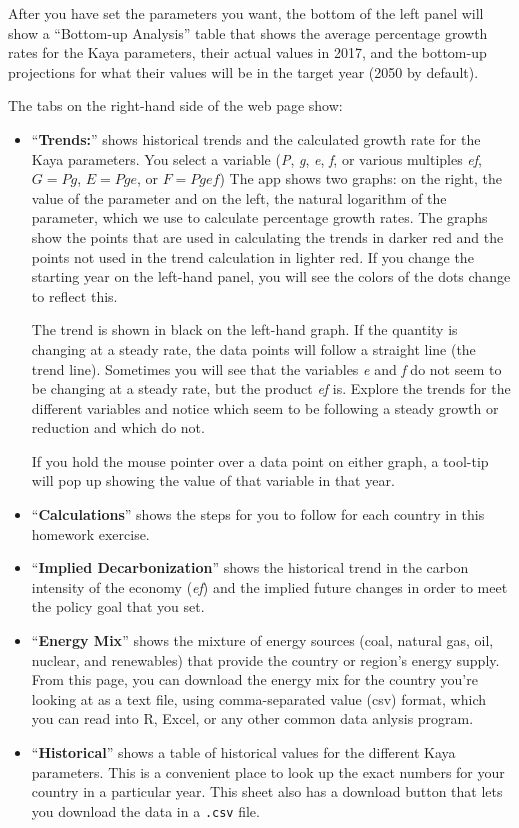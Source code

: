 \documentclass[
]{article}
\begin{document}
After you have set the parameters you want, the bottom of the left panel
will show a ``Bottom-up Analysis'' table that shows the average
percentage growth rates for the Kaya parameters, their actual values in
2017, and the bottom-up projections for what their values will be in the
target year (2050 by default).

The tabs on the right-hand side of the web page show:

\begin{itemize}
\item
  ``\textbf{Trends:}'' shows historical trends and the calculated growth
  rate for the Kaya parameters. You select a variable (\emph{P},
  \emph{g}, \emph{e}, \emph{f}, or various multiples \emph{ef},
  \(G = Pg\), \(E = Pge\), or \(F = Pgef\)) The app shows two graphs: on
  the right, the value of the parameter and on the left, the natural
  logarithm of the parameter, which we use to calculate percentage
  growth rates. The graphs show the points that are used in calculating
  the trends in darker red and the points not used in the trend
  calculation in lighter red. If you change the starting year on the
  left-hand panel, you will see the colors of the dots change to reflect
  this.

  The trend is shown in black on the left-hand graph. If the quantity is
  changing at a steady rate, the data points will follow a straight line
  (the trend line). Sometimes you will see that the variables \emph{e}
  and \emph{f} do not seem to be changing at a steady rate, but the
  product \emph{ef} is. Explore the trends for the different variables
  and notice which seem to be following a steady growth or reduction and
  which do not.

  If you hold the mouse pointer over a data point on either graph, a
  tool-tip will pop up showing the value of that variable in that year.
\item
  ``\textbf{Calculations}'' shows the steps for you to follow for each
  country in this homework exercise.
\item
  ``\textbf{Implied Decarbonization}'' shows the historical trend in the
  carbon intensity of the economy (\emph{ef}) and the implied future
  changes in order to meet the policy goal that you set.
\item
  ``\textbf{Energy Mix}'' shows the mixture of energy sources (coal,
  natural gas, oil, nuclear, and renewables) that provide the country or
  region's energy supply. From this page, you can download the energy
  mix for the country you're looking at as a text file, using
  comma-separated value (csv) format, which you can read into R, Excel,
  or any other common data anlysis program.
\item
  ``\textbf{Historical}'' shows a table of historical values for the
  different Kaya parameters. This is a convenient place to look up the
  exact numbers for your country in a particular year. This sheet also
  has a download button that lets you download the data in a
  \texttt{.csv} file.
\end{itemize}
\end{document}
